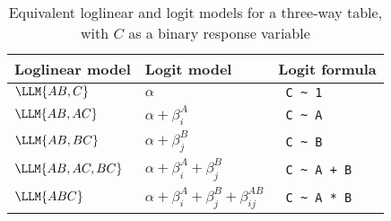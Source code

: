 \begin{table}[!htb]
 \caption{Equivalent loglinear and logit models for a three-way table, with $C$ as
  a binary response variable}\label{tab:loglin-logit}
\centering
\begin{tabular}{lll}
\hline
Loglinear model  & Logit model           & Logit formula  \\
\hline
$\LLM{AB,C}$     & $\alpha$              & \verb| C ~ 1 | \\
$\LLM{AB,AC}$    & $\alpha + \beta_i^A$  & \verb| C ~ A | \\
$\LLM{AB,BC}$    & $\alpha + \beta_j^B$  & \verb| C ~ B | \\
$\LLM{AB,AC,BC}$ & $\alpha + \beta_i^A + \beta_j^B$  & \verb| C ~ A + B | \\
$\LLM{ABC}$      & $\alpha + \beta_i^A + \beta_j^B + \beta_{ij}^{AB}$  & \verb| C ~ A * B | \\
\hline
\end{tabular}
\end{table}